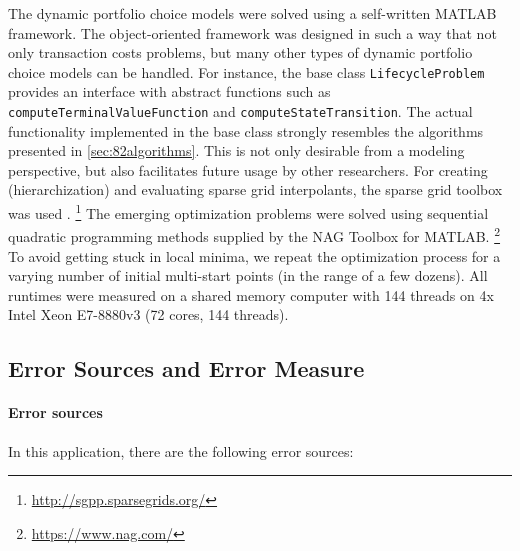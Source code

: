 The dynamic portfolio choice models were solved using a self-written
MATLAB framework.
The object-oriented framework was designed in such a way that
not only transaction costs problems,
but many other types of dynamic portfolio choice models can be handled.
For instance, the base class \texttt{LifecycleProblem} provides
an interface with abstract functions such as
\texttt{computeTerminalValueFunction} and
\texttt{computeStateTransition}.
The actual functionality implemented in the base class strongly resembles
the algorithms presented in \cref{sec:82algorithms}.
This is not only desirable from a modeling perspective,
but also facilitates future usage by other researchers.
For creating (hierarchization) and evaluating sparse grid interpolants,
the sparse grid toolbox \sgpp was used \cite{Pflueger10Spatially}.%
\footnote{%
  \url{http://sgpp.sparsegrids.org/}%
}
The emerging optimization problems were solved using
sequential quadratic programming methods supplied by the
NAG Toolbox for MATLAB.%
\footnote{%
  \url{https://www.nag.com/}%
}
To avoid getting stuck in local minima,
we repeat the optimization process for a varying number
of initial multi-start points (in the range of a few dozens).
All runtimes were measured on a shared memory computer
with 144 threads on 4x Intel Xeon E7-8880v3 (72 cores, 144 threads).



\subsection{Error Sources and Error Measure}
\label{sec:842errorSources}

\paragraph{Error sources}

In this application, there are the following error sources:

